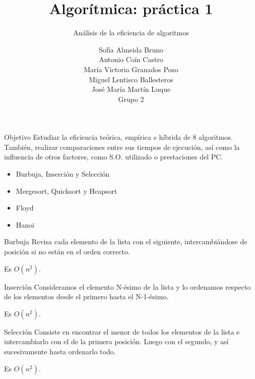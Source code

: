 \documentclass[spanish]{beamer}
\title{Algorítmica: práctica 1}
\subtitle{Análisis de la eficiencia de algoritmos}
\author{Sofía Almeida Bruno\\ Antonio Coín Castro\\ María Victoria Granados Pozo\\ Miguel Lentisco Ballesteros\\ José María Martín Luque\\ \vspace{1em}Grupo 2}
\begin{document}
\maketitle

\begin{frame}{Objetivo}
	Estudiar la eficiencia teórica, empírica e híbrida de 8 algoritmos. También, realizar comparaciones entre sus tiempos de ejecución, así como la influencia de otros factores, como S.O. utilizado o prestaciones del PC.
	
	\begin{itemize}
		\item Burbuja, Inserción y Selección
		\item Mergesort, Quicksort y Heapsort
		\item Floyd
		\item Hanoi
	\end{itemize}
\end{frame}

\begin{frame}{Burbuja}
	Revisa cada elemento de la lista con el siguiente, intercambiándose de posición si no están en el orden correcto.
	
	\vskip 0.5cm
	
	Es $O(n^2)$.
	
\end{frame}

\begin{frame}{}
	\begin{center}
		
	\end{center}
\end{frame}

\begin{frame}{Inserción}
	Consideramos el elemento N-ésimo de la lista y lo ordenamos respecto de los elementos desde el primero hasta el N-1-ésimo.
	
	\vskip 0.5cm
	
	Es $O(n^2)$.
\end{frame}

\begin{frame}
	\begin{center}
		
	\end{center}
\end{frame}

\begin{frame}{Selección}
	Consiste en encontrar el menor de todos los elementos de la lista e intercambiarlo con el de la primera posición. Luego con el segundo, y así sucesivamente hasta ordenarlo todo.
	\vskip 0.5cm
	
	Es $O(n^2)$.
\end{frame}
\end{document}
